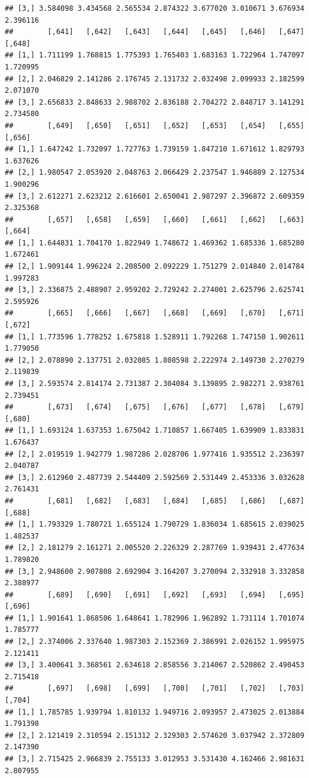 \documentclass[article]{jss}\usepackage[]{graphicx}\usepackage[]{xcolor}
\makeatletter
\newenvironment{kframe}{%
 \def\at@end@of@kframe{}%
 \ifinner\ifhmode%
  \def\at@end@of@kframe{\end{minipage}}%
  \begin{minipage}{\columnwidth}%
 \fi\fi%
 \def\FrameCommand##1{\hskip\@totalleftmargin \hskip-\fboxsep
 \colorbox{shadecolor}{##1}\hskip-\fboxsep
     \hskip-\linewidth \hskip-\@totalleftmargin \hskip\columnwidth}%
 \MakeFramed {\advance\hsize-\width
   \@totalleftmargin\z@ \linewidth\hsize
   \@setminipage}}%
 {\par\unskip\endMakeFramed%
 \at@end@of@kframe}
\newenvironment{knitrout}{}{} %
\makeatother
\begin{document}
\begin{knitrout}
\begin{kframe}
\begin{verbatim}
## [3,] 3.584098 3.434568 2.565534 2.874322 3.677020 3.010671 3.676934 2.396116
##        [,641]   [,642]   [,643]   [,644]   [,645]   [,646]   [,647]   [,648]
## [1,] 1.711199 1.768815 1.775393 1.765403 1.683163 1.722964 1.747097 1.720995
## [2,] 2.046829 2.141286 2.176745 2.131732 2.032498 2.099933 2.182599 2.071070
## [3,] 2.656833 2.848633 2.988702 2.836188 2.704272 2.848717 3.141291 2.734580
##        [,649]   [,650]   [,651]   [,652]   [,653]   [,654]   [,655]   [,656]
## [1,] 1.647242 1.732097 1.727763 1.739159 1.847210 1.671612 1.829793 1.637626
## [2,] 1.980547 2.053920 2.048763 2.066429 2.237547 1.946889 2.127534 1.900296
## [3,] 2.612271 2.623212 2.616601 2.650041 2.987297 2.396872 2.609359 2.325368
##        [,657]   [,658]   [,659]   [,660]   [,661]   [,662]   [,663]   [,664]
## [1,] 1.644831 1.704170 1.822949 1.748672 1.469362 1.685336 1.685280 1.672461
## [2,] 1.909144 1.996224 2.208500 2.092229 1.751279 2.014840 2.014784 1.997283
## [3,] 2.336875 2.488907 2.959202 2.729242 2.274001 2.625796 2.625741 2.595926
##        [,665]   [,666]   [,667]   [,668]   [,669]   [,670]   [,671]   [,672]
## [1,] 1.773596 1.778252 1.675818 1.528911 1.792268 1.747150 1.902611 1.779050
## [2,] 2.078890 2.137751 2.032085 1.808598 2.222974 2.149730 2.270279 2.119839
## [3,] 2.593574 2.814174 2.731387 2.304084 3.139895 2.982271 2.938761 2.739451
##        [,673]   [,674]   [,675]   [,676]   [,677]   [,678]   [,679]   [,680]
## [1,] 1.693124 1.637353 1.675042 1.710857 1.667405 1.639909 1.833831 1.676437
## [2,] 2.019519 1.942779 1.987286 2.028706 1.977416 1.935512 2.236397 2.040787
## [3,] 2.612960 2.487739 2.544409 2.592569 2.531449 2.453336 3.032628 2.761431
##        [,681]   [,682]   [,683]   [,684]   [,685]   [,686]   [,687]   [,688]
## [1,] 1.793329 1.780721 1.655124 1.790729 1.836034 1.685615 2.039025 1.482537
## [2,] 2.181279 2.161271 2.005520 2.226329 2.287769 1.939431 2.477634 1.789820
## [3,] 2.948600 2.907808 2.692904 3.164207 3.270094 2.332918 3.332858 2.388977
##        [,689]   [,690]   [,691]   [,692]   [,693]   [,694]   [,695]   [,696]
## [1,] 1.901641 1.868506 1.648641 1.782906 1.962892 1.731114 1.701074 1.785777
## [2,] 2.374006 2.337640 1.987303 2.152369 2.386991 2.026152 1.995975 2.121411
## [3,] 3.400641 3.368561 2.634618 2.858556 3.214067 2.520862 2.490453 2.715418
##        [,697]   [,698]   [,699]   [,700]   [,701]   [,702]   [,703]   [,704]
## [1,] 1.785785 1.939794 1.810132 1.949716 2.093957 2.473025 2.013884 1.791398
## [2,] 2.121419 2.310594 2.151312 2.329303 2.574620 3.037942 2.372809 2.147390
## [3,] 2.715425 2.966839 2.755133 3.012953 3.531430 4.162466 2.981631 2.807955

\end{verbatim}
\end{kframe}
\end{knitrout}
\end{document}
